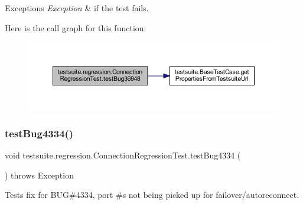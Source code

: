 \begin{DoxyExceptions}{Exceptions}
{\em Exception} & if the test fails. \\
\hline
\end{DoxyExceptions}
Here is the call graph for this function\+:
\nopagebreak
\begin{figure}[H]
\begin{center}
\leavevmode
\includegraphics[width=350pt]{classtestsuite_1_1regression_1_1_connection_regression_test_a7d937c6b4d025862d519876bc472989b_cgraph}
\end{center}
\end{figure}
\mbox{\label{classtestsuite_1_1regression_1_1_connection_regression_test_a83abae1bb52b0bab9efe6949e40faecf}} 
\subsubsection{\texorpdfstring{test\+Bug4334()}{testBug4334()}}
{\footnotesize\ttfamily void testsuite.\+regression.\+Connection\+Regression\+Test.\+test\+Bug4334 (\begin{DoxyParamCaption}{ }\end{DoxyParamCaption}) throws Exception}

Tests fix for B\+UG\#4334, port \#\textquotesingle{}s not being picked up for failover/autoreconnect.


